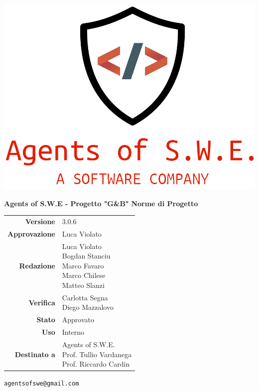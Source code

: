 


\begin{titlepage}
\thispagestyle{empty}

\begin{center}
\includegraphics[scale=0.3]{./images/logo.png} 

\large \textbf{Agents of S.W.E - Progetto "G\&B"}
\vfill
\Huge \textbf{Norme di Progetto}
\vfill
\large
\renewcommand{\arraystretch}{1.3}
\begin{tabular}{r|l}

\textbf{Versione} & 3.0.6\\

\textbf{Approvazione} & Luca Violato\\
\textbf{Redazione} & \parbox[t]{5cm}{Luca Violato\\Bogdan Stanciu\\Marco Favaro\\Marco Chilese \\ Matteo Slanzi}\\\
\textbf{Verifica} & \parbox[t]{5cm}{Carlotta Segna \\ Diego Mazzalovo}\\
\textbf{Stato} & Approvato\\
\textbf{Uso} & Interno\\
\textbf{Destinato a} & \parbox[t]{5cm}{Agents of S.W.E. \\Prof. Tullio Vardanega\\Prof. Riccardo Cardin}
\end{tabular}
\vfill
\small
\texttt{agentsofswe@gmail.com}
\end{center}
\end{titlepage}

